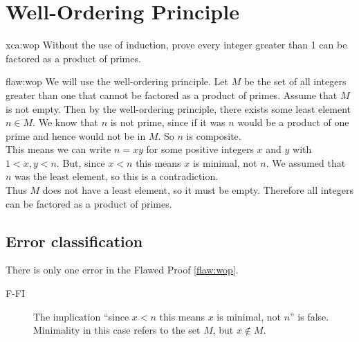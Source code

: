 \section{Well-Ordering Principle}

\begin{xca}{xca:wop}
Without the use of induction, prove every integer greater than 1 can be factored as a product of primes.
\end{xca}

\begin{flaw}{flaw:wop} %
We will use the well-ordering principle. Let $M$ be the set of all integers greater than one that cannot be factored as a product of primes. Assume that $M$ is not empty. Then by the well-ordering principle, there exists some least element $n \in M$. We know that $n$ is not prime, since if it was $n$ would be a product of one prime and hence would not be in $M$. So $n$ is composite. \\

This means we can write $n = xy$ for some positive integers $x$ and $y$ with $1 < x,y < n$. But, since $x < n$ this means $x$ is minimal, not $n$. We assumed that $n$ was the least element, so this is a contradiction. \\

Thus $M$ does not have a least element, so it must be empty. Therefore all integers can be factored as a product of primes.

\end{flaw}

\clearpage
\subsection{Error classification}


There is only one error
 in the Flawed Proof \ref{flaw:wop}. %

 \begin{description}
    \item[F-FI]  The implication ``since $x < n$ this means $x$ is minimal, not $n$'' is false. Minimality in this case refers to the set $M$, but $x \notin M$.
 	
 \end{description}


